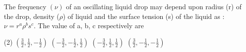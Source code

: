 \item The frequency \( (\nu) \) of an oscillating liquid drop may depend upon radius (r) of the drop, density (\(\rho\)) of liquid and the surface tension (s) of the liquid as : \(\nu = r^a \rho^b s^c\). The value of a, b, c respectively are
    \begin{tasks}(2)
        \task \(\left( \frac{3}{2}, \frac{1}{2}, -\frac{1}{2} \right)\)
        \task \(\left( -\frac{3}{2}, -\frac{1}{2}, \frac{1}{2} \right)\)
        \task \(\left( -\frac{3}{2}, \frac{1}{2}, \frac{1}{2} \right)\)
        \task \(\left( \frac{3}{2}, -\frac{1}{2}, -\frac{1}{2} \right)\)
    \end{tasks}